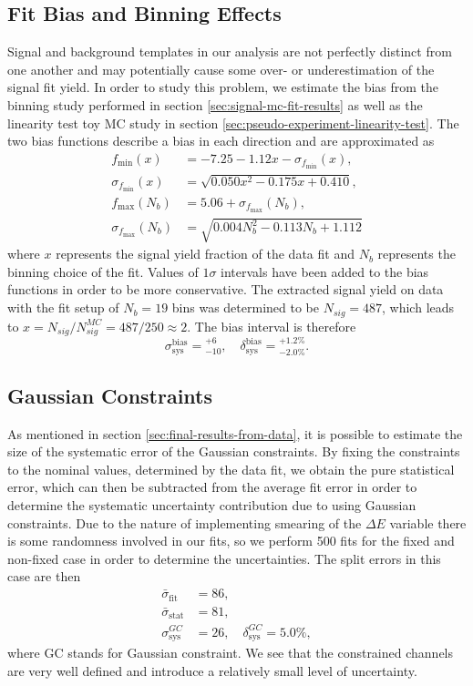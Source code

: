 \subsection{Fit Bias and Binning Effects}
Signal and background templates in our analysis are not perfectly distinct from one another and may potentially cause some over- or underestimation of the signal fit yield. In order to study this problem, we estimate the bias from the binning study performed in section \ref{sec:signal-mc-fit-results} as well as the linearity test toy MC study in section \ref{sec:pseudo-experiment-linearity-test}. The two bias functions describe a bias in each direction and are approximated as
\begin{align}
f_{\mathrm{min}}(x) &= -7.25-1.12x - \sigma_{f_{\mathrm{min}}}(x), \\
\sigma_{f_{\mathrm{min}}}(x) &= \sqrt{0.050 x^2 - 0.175 x + 0.410}, \\
f_{\mathrm{max}}(N_b) &= 5.06 + \sigma_{f_{\mathrm{max}}}(N_b), \\
\sigma_{f_{\mathrm{max}}}(N_b) &= \sqrt{0.004N_b^2 - 0.113 N_b + 1.112}
\end{align}
where $x$ represents the signal yield fraction of the data fit and $N_b$ represents the binning choice of the fit. Values of $1\sigma$ intervals have been added to the bias functions in order to be more conservative. The extracted signal yield on data  with the fit setup of $N_b=19$ bins was determined to be $N_{sig} = 487$, which leads to $x = N_{sig} / N_{sig}^{MC} = 487 / 250 \approx 2$. The bias interval is therefore
\begin{equation}
\sigma_{\mathrm{sys}}^{\mathrm{bias}} = {}^{+6}_{-10},\quad \delta_{\mathrm{sys}}^{\mathrm{bias}} = {}^{+1.2\%}_{-2.0\%}.
\end{equation}

\subsection{Gaussian Constraints}
As mentioned in section \ref{sec:final-results-from-data}, it is possible to estimate the size of the systematic error of the Gaussian constraints. By fixing the constraints to the nominal values, determined by the data fit, we obtain the pure statistical error, which can then be subtracted from the average fit error in order to determine the systematic uncertainty contribution due to using Gaussian constraints. Due to the nature of implementing smearing of the $\Delta E$ variable there is some randomness involved in our fits, so we perform 500 fits for the fixed and non-fixed case in order to determine the uncertainties. The split errors in this case are then
\begin{align}
\bar \sigma_{\mathrm{fit}} &= 86, \\
\bar \sigma_{\mathrm{stat}} &= 81, \\
\sigma_{\mathrm{sys}}^{GC} &= 26,\quad \delta_{\mathrm{sys}}^{GC} = 5.0\%,
\end{align}
where GC stands for Gaussian constraint. We see that the constrained channels are very well defined and introduce a relatively small level of uncertainty.


